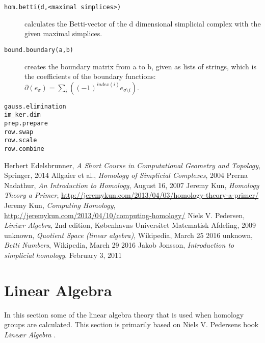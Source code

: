 \documentclass[11pt,a4paper,twoside]{report}
\begin{document}
\begin{description}
\item[\texttt{hom.betti(d,<maximal simplices>)}] calculates the Betti-vector of the d dimensional simplicial complex with the given maximal simplices.
\item[\texttt{bound.boundary(a,b)}]creates the boundary matrix from a to b, given as lists of strings, which is the coefficients of the boundary functions: $\partial(e_{\sigma}) = \sum_i((-1)^{index(i)}e_{\sigma\setminus i})$.
\item[\texttt{gauss.elimination}] 
\item[\texttt{im\_ker.dim}] 
\item[\texttt{prep.prepare}] 
\item[\texttt{row.swap}] 
\item[\texttt{row.scale}] 
\item[\texttt{row.combine}] 
\end{description}


\newpage

\begin{thebibliography}{9}
Herbert Edelsbrunner, \emph{A Short Course in Computational Geometry and Topology}, Springer, 2014
 Allgaier et al., \emph{Homology of Simplicial Complexes}, 2004
 Prerna Nadathur, \emph{An Introduction to Homology}, August 16, 2007
 Jeremy Kun, \emph{Homology Theory a Primer}, \url{http://jeremykun.com/2013/04/03/homology-theory-a-primer/}
 Jeremy Kun, \emph{Computing Homology}, \url{http://jeremykun.com/2013/04/10/computing-homology/}
 Niels V. Pedersen, \emph{Liniær Algebra}, 2nd edition, Københavns Universitet Matematisk Afdeling, 2009
 unknown, \emph{Quotient Space (linear algebra)}, Wikipedia, March 25 2016
 unknown, \emph{Betti Numbers}, Wikipedia, March 29 2016
 Jakob Jonsson, \emph{Introduction to simplicial homology}, February 3, 2011
\end{thebibliography}

\appendix
\chapter{Linear Algebra}
In this section some of the linear algebra theory that is used when homology groups are calculated. This section is primarily based on Niels V. Pedersens book \emph{Lineær Algebra} \cite{LinAlg}.
\end{document}
